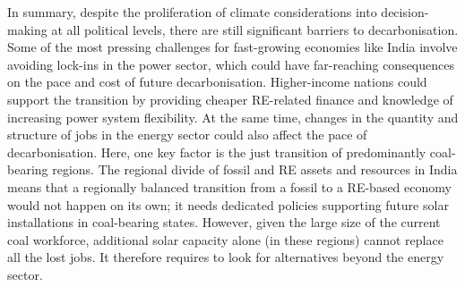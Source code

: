 \documentclass[../thesis.tex]{subfiles}
\begin{document}
In summary, despite the proliferation of climate considerations into decision-making at all political levels, there are still significant barriers to decarbonisation. Some of the most pressing challenges for fast-growing economies like India involve avoiding lock-ins in the power sector, which could have far-reaching consequences on the pace and cost of future decarbonisation. Higher-income nations could support the transition by providing cheaper RE-related finance and knowledge of increasing power system flexibility. At the same time, changes in the quantity and structure of jobs in the energy sector could also affect the pace of decarbonisation. Here, one key factor is the just transition of predominantly coal-bearing regions. The regional divide of fossil and RE assets and resources in India means that a regionally balanced transition from a fossil to a RE-based economy would not happen on its own; it needs dedicated policies supporting future solar installations in coal-bearing states. However, given the large size of the current coal workforce, additional solar capacity alone (in these regions) cannot replace all the lost jobs. It therefore requires to look for alternatives beyond the energy sector. 
\end{document}
